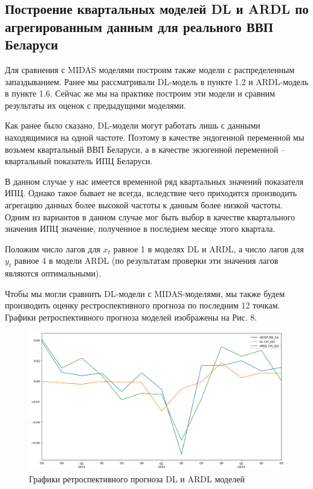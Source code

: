 \documentclass[a4paper, 12pt]{extarticle}
\numberwithin{equation}{subsection}
\begin{document}
	\subsection{Построение квартальных моделей DL и ARDL по агрегированным данным для реального ВВП Беларуси}
	Для сравнения с MIDAS моделями построим также модели с распределенным запаздыванием. Ранее мы рассматривали DL-модель в пункте 1.2 и ARDL-модель в пункте 1.6. Сейчас же мы на практике построим эти модели и сравним результаты их оценок с предыдущими моделями.
	
	Как ранее было сказано, DL-модели могут работать лишь с данными находящимися на одной частоте. Поэтому в качестве эндогенной переменной мы возьмем квартальный ВВП Беларуси, а в качестве экзогенной переменной -- квартальный показатель ИПЦ Беларуси. 
	
	В данном случае у нас имеется временной ряд квартальных значений показателя ИПЦ. Однако такое бывает не всегда, вследствие чего приходится производить агрегацию данных более высокой частоты к данным более низкой частоты. Одним из вариантов в данном случае мог быть выбор в качестве квартального значения ИПЦ значение, полученное в последнем месяце этого квартала.
	
	Положим число лагов для $x_t$ равное 1 в моделях DL и ARDL, а число лагов для $y_t$ равное 4 в модели ARDL (по результатам проверки эти значения лагов являются оптимальными). 
	
	Чтобы мы могли сравнить DL-модели с MIDAS-моделями, мы также будем производить оценку рестроспективного прогноза по последним 12 точкам. Графики ретроспективного прогноза моделей изображены на Рис. 8.
	
	\begin{figure}[h]
		\centering
		\includegraphics[scale=0.5]{images/img08}
		\caption{Графики ретроспективного прогноза DL и ARDL моделей}
		\label{fig:img08}
	\end{figure}
	
\end{document}
